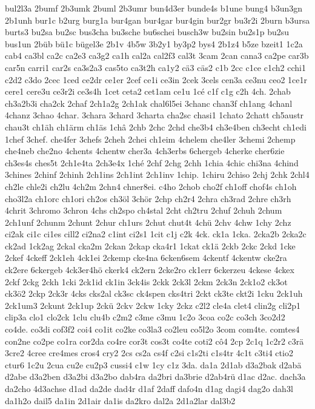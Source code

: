 {bul2l3a
2bumf
2b3umk
2buml
2b3umr
bun4d3er
bunde4s
b1une
bung4
b3un3gn
2b1unh
bur1c
b2urg
burg1a
bur4gan
bur4gar
bur4gin
bur2gr
bu3r2i
2burn
b3ursa
burts3
bu2sa
bu2sc
bus3cha
bu3sche
bu6schei
busch3w
bu2sin
bu2s1p
bu2su
bus1un
2büb
bü1c
bügel3e
2b1v
4b5w
3b2y1
by3p2
bys4
2b1z4
b5ze
bzeit1
1c2a
cab4
ca3bl
ca2c
ca2e3
ca3g2
ca1h
cal2a
cal2f3
cal3t
3cam
2can
cana3
ca2pe
car3b
car5n
carri1
car2s
ca3s2a3
cas5to
ca3t2h
ca1y2
cä3
cäs2
c1b
2cc
c1ce
c1ch2
cchi1
c2d2
c3do
2cec
1ced
ce2dr
ce1er
2cef
ce1i
ce3in
2cek
3cels
cen3a
ce3nu
ceo2
1ce1r
cere1
cere3u
ce3r2i
ce3s4h
1cet
ceta2
cet1am
ce1u
1cé
c1f
c1g
c2h
4ch.
2chab
ch3a2b3i
cha2ck
2chaf
2ch1a2g
2ch1ak
chal6l5ei
3chanc
chan3f
ch1ang
4chanl
4chanz
3chao
4char.
3chara
3chard
3charta
cha2sc
chasi1
1chato
2chatt
ch5austr
chau3t
ch1äh
ch1ärm
ch1äs
1châ
2chb
2chc
2chd
che3b4
ch3e4ben
ch3echt
ch1edi
1chef
3chef.
che4fer
3chefs
2cheh
2chei
ch1eim
4chelem
che4ler
3chemi
2chemp
che4neb
che2no
4chents
4chentw
cher3a
4ch3erbs
6chergeb
4cherke
cher6zie
ch3es4s
ches5t
2ch1e4ta
2ch3e4x
1ché
2chf
2chg
2chh
1chia
4chic
chi3na
4chind
3chines
2chinf
2chinh
2ch1ins
2ch1int
2ch1inv
1chip.
1chiru
2chiso
2chj
2chk
2chl4
ch2le
chle2i
ch2lu
4ch2m
2chn4
chner8ei.
c4ho
2chob
cho2f
ch1off
chof4s
ch1oh
cho3l2a
ch1orc
ch1ori
ch2os
ch3öl
3chör
2chp
ch2r4
2chra
ch3rad
2chre
ch3rh
4chrit
3chromo
3chron
4chs
ch2spo
ch4stal
2cht
ch2tru
2chuf
2chuh
2chum
2ch1unf
2chunm
2chunt
2chur
ch1urs
2chut
chut4t
4chü
2chv
4chw
1chy
2chz
ci2ak
ci1c
ci1es
cill2
ci2na2
c1int
ci2s1
1cit
c1j
c2k
4ck.
ck1a
1cka.
2cka2b
2cka2c
ck2ad
1ck2ag
2ckal
cka2m
2ckan
2ckap
cka4r1
1ckat
ck1ä
2ckb
2ckc
2ckd
1cke
2ckef
4ckeff
2ck1eh
4ck1ei
2ckemp
cke4na
6cken6sem
4ckentf
4ckentw
cke2ra
ck2ere
6ckergeb
4ck3er4hö
ckerk4
ck2ern
2cke2ro
ck1err
6ckerzeu
4ckese
4ckex
2ckf
2ckg
2ckh
1cki
2ck1id
ck1in
3ck4is
2ckk
2ck3l
2ckm
2ck3n
2ck1o2
ck3ot
ck3ö2
2ckp
2ck3r
4cks
cks2al
ck3sc
ck4spen
cks4tri
2ckt
ck3te
ckt2i
1cku
2ck1uh
2ck1um3
2ckunt
2ck1up
2ckü
2ckv
2ckw
1cky
2ckz
c2l2
cle4a
clet4
clin2g
cli2p1
clip3a
clo1
clo2ck
1clu
clu4b
c2m2
c3me
c3mu
1c2o
3coa
co2c
co3ch
3co2d2
co4de.
co3di
cof3f2
coi4
co1it
co2ke
co3la3
co2leu
co5l2o
3com
com4te.
comtes4
con2ne
co2pe
co1ra
cor2da
co4re
cor3t
cos3t
co4te
coti2
cô4
2cp
2c1q
1c2r2
c3rä
3cre2
4cree
cre4mes
cros4
cry2
2cs
cs2a
cs4f
c2si
c1s2ti
c1s4tr
4c1t
c3ti4
ctio2
ctur6
1c2u
2cua
cu2e
cu2p3
cussi4
c1w
1cy
c1z
3da.
da1a
2d1ab
d3a2bak
d2abä
d2abe
d3a2ben
d3a2bi
d3a2bo
dab4ra
da2bri
da3brie
d2ab4rü
d1ac
d2ac.
dach3a
da2cho
4d3achse
d1ad
da2de
dad4r
d1af
2daff
dafo4n
d1ag
dagi4
dag2o
dah3l
da1h2o
dail5
da1in
2d1air
da1is
da2kro
dal2a
2d1a2lar
dal3b2
}
